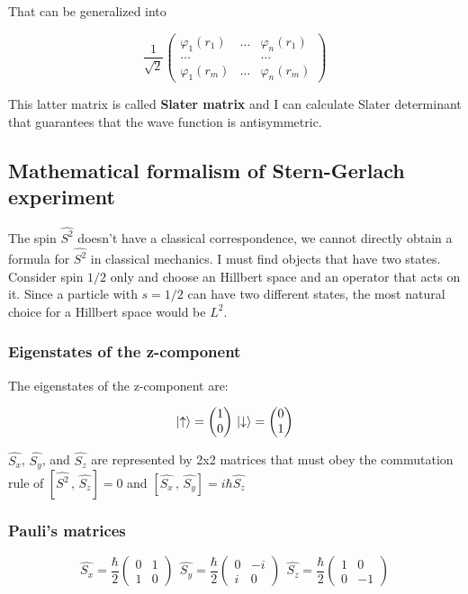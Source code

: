 		That can be generalized into

 		$$\frac{1}{\sqrt{2}}\begin{pmatrix} \varphi_1(r_1)&\dots&\varphi_n(r_1)\\\dots& &\dots\\ \varphi_1(r_m)&\dots&\varphi_n(r_m) \end{pmatrix}$$

		This latter matrix is called \textbf{Slater matrix} and I can calculate Slater determinant that guarantees that the wave function is antisymmetric.

	\subsection{Mathematical formalism of Stern-Gerlach experiment}
	The spin $\hat{S^2}$ doesn't have a classical correspondence, we cannot directly obtain a formula for $\hat{S^2}$ in classical mechanics.
I must find objects that have two states.
	Consider spin $1/2$ only and choose an Hillbert space and an operator that acts on it.
Since a particle with $s=1/2$ can have two different states, the most natural choice for a Hillbert space would be \emph{$L^2$}.

		\subsubsection{Eigenstates of the z-component}
		The eigenstates of the z-component are:

		$$\ket{\uparrow}=\begin{pmatrix}1\\0\end{pmatrix}\, \ket{\downarrow}=\begin{pmatrix}0\\1\end{pmatrix}$$

		$\hat{S_x}$, $\hat{S_y}$, and $\hat{S_z}$ are represented by 2x2 matrices that must obey the commutation rule of $[\hat{S^2}\,,\,\hat{S_z}]=0$ and $[\hat{S_x}\,,\,\hat{S_y}]=i\hbar\hat{S_z}$

		\subsubsection{Pauli's matrices}

		$$\hat{S_x}=\frac{\hbar}{2}\begin{pmatrix}0&1\\1&0\end{pmatrix}\;\,\hat{S_y}=\frac{\hbar}{2}\begin{pmatrix}0&-i\\i&0\end{pmatrix}\;\,	\hat{S_z}=\frac{\hbar}{2}\begin{pmatrix}1&0\\0&-1\end{pmatrix}$$

